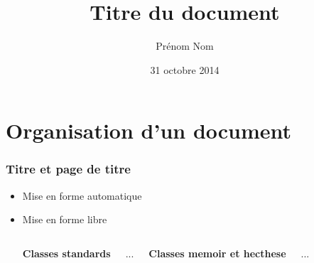 \section{Organisation d'un document}


\begin{frame}[fragile]

	\frametitle{Titre et page de titre}
	
	\begin{itemize}
		
		\item Mise en forme automatique
		
		\begin{codesource}
	\title{Titre du document}
	\author{Prénom Nom}
	\date{31 octobre 2014} %
	\maketitle
		\end{codesource}
	
		\item Mise en forme libre
		
		\begin{columns}
			\column{.4\textwidth}			
			\textbf{Classes standards}
			
			\begin{codesource}
	\begin{titlepage}
		...
	\end{titlepage}
			\end{codesource}
		
			\textbf{Classes memoir et hecthese}
			
			\begin{codesource}
	\begin{titlingpage}
		...
	\end{titlingpage}
			\end{codesource}
			\end{columns}
		
	\end{itemize}
\end{frame}


